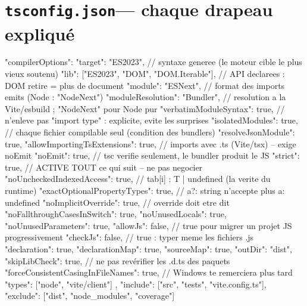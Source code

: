 \section{\texttt{tsconfig.json}--- chaque drapeau expliqu\'e}

\begin{codejson}
{
  "compilerOptions": {
    "target": "ES2023",                       // syntaxe generee (le moteur cible le plus vieux soutenu)
    "lib": ["ES2023", "DOM", "DOM.Iterable"], // API declarees : DOM retire = plus de document
    "module": "ESNext",                        // format des imports emits (Node : "NodeNext")
    "moduleResolution": "Bundler",               // resolution a la Vite/esbuild ; "NodeNext" pour Node pur
    "verbatimModuleSyntax": true,                // n'enleve pas "import type" : explicite, evite les surprises
    "isolatedModules": true,                     // chaque fichier compilable seul (condition des bundlers)
    "resolveJsonModule": true,
    "allowImportingTsExtensions": true,           // imports avec .ts (Vite/tsx) -- exige noEmit
    "noEmit": true,                                // tsc verifie seulement, le bundler produit le JS
    "strict": true,                                // ACTIVE TOUT ce qui suit -- ne pas negocier
    "noUncheckedIndexedAccess": true,              // tab[i] : T | undefined  (la verite du runtime)
    "exactOptionalPropertyTypes": true,            // { a?: string } n'accepte plus a: undefined
    "noImplicitOverride": true,                     // override doit etre dit
    "noFallthroughCasesInSwitch": true,
    "noUnusedLocals": true, "noUnusedParameters": true,
    "allowJs": false,                               // true pour migrer un projet JS progressivement
    "checkJs": false,                               // true : typer meme les fichiers .js
    "declaration": true, "declarationMap": true, "sourceMap": true,
    "outDir": "dist",
    "skipLibCheck": true,                             // ne pas rev\'erifier les .d.ts des paquets
    "forceConsistentCasingInFileNames": true,          // Windows te remerciera plus tard
    "types": ["node", "vite/client"]
  },
  "include": ["src", "tests", "vite.config.ts"],
  "exclude": ["dist", "node_modules", "coverage"]
}
\end{codejson}


